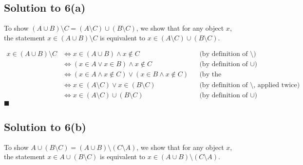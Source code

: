 \documentclass{scrartcl}
\begin{document}
    \subsection*{Solution to 6(a)}
    To show $(A \cup B) \setminus C = (A \setminus C) \cup (B \setminus C)$, we show that for any object $x$, \\
    the statement $x \in (A \cup B) \setminus C$ is equivalent to $x \in (A \setminus C) \cup (B \setminus C)$.

    \begin{align*}
        x \in (A \cup B) \setminus C
        &\Leftrightarrow x \in (A \cup B) \wedge x \notin C 
        && \text{(by definition of $\setminus$)} \\
        &\Leftrightarrow (x \in A \vee x \in B) \wedge x \notin C
        && \text{(by definition of $\cup$)} \\
        &\Leftrightarrow  (x \in A \wedge x \notin C) \vee (x \in B \wedge x \notin C)
        && \text{(by the Distributive Law)} \\
        &\Leftrightarrow  x \in (A \setminus C) \vee x \in (B \setminus C)
        && \text{(by definition of $\setminus$, applied twice)} \\
        &\Leftrightarrow  x \in (A \setminus C) \cup (B \setminus C)
        && \text{(by definition of $\cup$)}
    \end{align*}
    \hfill $\blacksquare$

    \subsection*{Solution to 6(b)}
        To show $A \cup (B \setminus C) = (A \cup B) \setminus (C \setminus A)$, we show that for any object $x$, \\
        the statement $x \in A \cup (B \setminus C)$ is equivalent to $x \in (A \cup B) \setminus (C \setminus A)$.
\end{document}

